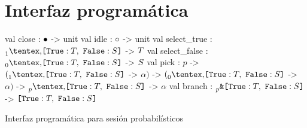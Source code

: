 \section{Interfaz programática}

\begin{table}[htb]
    \begin{OCamlD}[frame=single]
        val close        : ${\bullet}$ -> unit
        val idle         : ${\circ}$ -> unit
        val select_true  : $\BinaryPChoice[1]{\SessionTypeT}{\SessionTypeS}$ -> $T$
        val select_false : $\BinaryPChoice[0]{\SessionTypeT}{\SessionTypeS}$ -> $S$
        val pick         : $p$ -> $(\BinaryPChoice[1]{\SessionTypeT}{\SessionTypeS}$ -> $\alpha)$
                             -> $(\BinaryPChoice[0]{\SessionTypeT}{\SessionTypeS}$ -> $\alpha)$
                             -> $\BinaryPChoice[p]{\SessionTypeT}{\SessionTypeS}$ -> $\alpha$
        val branch       : $\BinaryPBranch[p]{\SessionTypeT}{\SessionTypeS}$
                             -> $\set{\Tag[True]: \SessionTypeT,\ \Tag[False]: \SessionTypeS}$
    \end{OCamlD}
    \caption{Interfaz programática para  sesión probabilísticos}
    \label{tab:prob_api}
\end{table}

